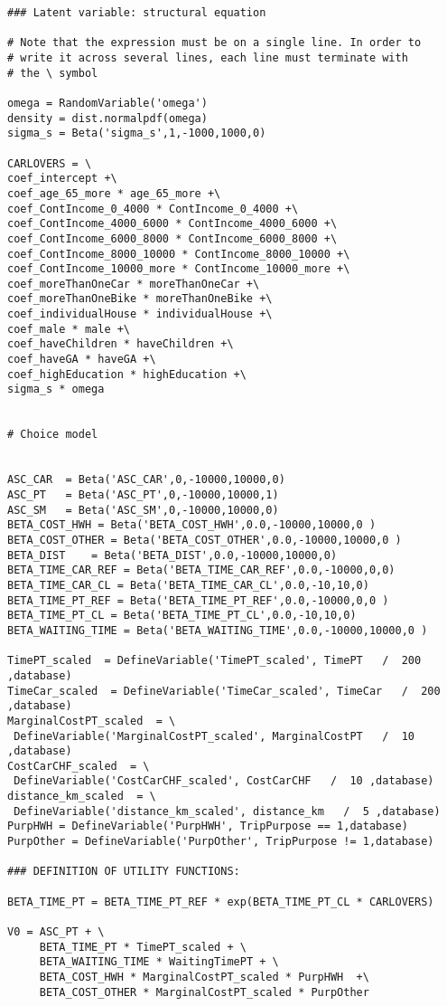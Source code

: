 \documentclass[12pt,a4paper]{article}
\begin{document}
\begin{lstlisting}[style=numbers]
### Latent variable: structural equation

# Note that the expression must be on a single line. In order to 
# write it across several lines, each line must terminate with 
# the \ symbol

omega = RandomVariable('omega')
density = dist.normalpdf(omega) 
sigma_s = Beta('sigma_s',1,-1000,1000,0)

CARLOVERS = \
coef_intercept +\
coef_age_65_more * age_65_more +\
coef_ContIncome_0_4000 * ContIncome_0_4000 +\
coef_ContIncome_4000_6000 * ContIncome_4000_6000 +\
coef_ContIncome_6000_8000 * ContIncome_6000_8000 +\
coef_ContIncome_8000_10000 * ContIncome_8000_10000 +\
coef_ContIncome_10000_more * ContIncome_10000_more +\
coef_moreThanOneCar * moreThanOneCar +\
coef_moreThanOneBike * moreThanOneBike +\
coef_individualHouse * individualHouse +\
coef_male * male +\
coef_haveChildren * haveChildren +\
coef_haveGA * haveGA +\
coef_highEducation * highEducation +\
sigma_s * omega


# Choice model


ASC_CAR	 = Beta('ASC_CAR',0,-10000,10000,0)
ASC_PT	 = Beta('ASC_PT',0,-10000,10000,1)
ASC_SM	 = Beta('ASC_SM',0,-10000,10000,0)
BETA_COST_HWH = Beta('BETA_COST_HWH',0.0,-10000,10000,0 )
BETA_COST_OTHER = Beta('BETA_COST_OTHER',0.0,-10000,10000,0 )
BETA_DIST	 = Beta('BETA_DIST',0.0,-10000,10000,0)
BETA_TIME_CAR_REF = Beta('BETA_TIME_CAR_REF',0.0,-10000,0,0)
BETA_TIME_CAR_CL = Beta('BETA_TIME_CAR_CL',0.0,-10,10,0)
BETA_TIME_PT_REF = Beta('BETA_TIME_PT_REF',0.0,-10000,0,0 )
BETA_TIME_PT_CL = Beta('BETA_TIME_PT_CL',0.0,-10,10,0)
BETA_WAITING_TIME = Beta('BETA_WAITING_TIME',0.0,-10000,10000,0 )

TimePT_scaled  = DefineVariable('TimePT_scaled', TimePT   /  200 ,database)
TimeCar_scaled  = DefineVariable('TimeCar_scaled', TimeCar   /  200 ,database)
MarginalCostPT_scaled  = \
 DefineVariable('MarginalCostPT_scaled', MarginalCostPT   /  10 ,database)
CostCarCHF_scaled  = \
 DefineVariable('CostCarCHF_scaled', CostCarCHF   /  10 ,database)
distance_km_scaled  = \
 DefineVariable('distance_km_scaled', distance_km   /  5 ,database)
PurpHWH = DefineVariable('PurpHWH', TripPurpose == 1,database)
PurpOther = DefineVariable('PurpOther', TripPurpose != 1,database)

### DEFINITION OF UTILITY FUNCTIONS:

BETA_TIME_PT = BETA_TIME_PT_REF * exp(BETA_TIME_PT_CL * CARLOVERS)

V0 = ASC_PT + \
     BETA_TIME_PT * TimePT_scaled + \
     BETA_WAITING_TIME * WaitingTimePT + \
     BETA_COST_HWH * MarginalCostPT_scaled * PurpHWH  +\
     BETA_COST_OTHER * MarginalCostPT_scaled * PurpOther


\end{lstlisting}
\end{document}
